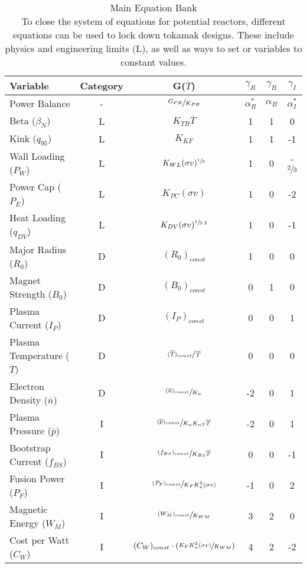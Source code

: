 \begin{table}[hb]
\caption[Main Equation Bank]{Main Equation Bank \\ \small To close the system of equations for potential reactors, different equations can be used to lock down tokamak designs. These include physics and engineering limits (L), as well as ways to set  or  variables to constant values.}
\begin{spacing}{1.5}
\begin{tabular}{lccccc}
 Variable & Category & G($\overline T$)  & $\gamma_R$ & $\gamma_B$ & $\gamma_{I}$ \\ \hline
Power Balance & - & $\sfrac{ G_{PB} }{ K_{PB} }$ & $\alpha_R^*$ & $\alpha_B$ & $\alpha_I^*$ \\
Beta ($\beta_N$) & L & $K_{TB} \overline T$ & 1 & 1 & 0 \\
Kink ($q_{95}$) & L & $K_{KF} $ & 1 & 1 & -1 \\
Wall Loading ($P_W$) & L & $K_{WL} ( \sigma v )^{\sfrac{1}{3}} $ & 1 & 0 & -$\sfrac{2}{3}$ \\
Power Cap ($P_E$) & L & $K_{PC} ( \sigma v ) $ & 1 & 0 & -2 \\
Heat Loading ($q_{DV}$) & L & $K_{DV} ( \sigma v )^{\sfrac{1}{3.2}} $ & 1 & 0 & -1 \\
Major Radius ($R_0$) & D & $(R_0)_{const}$ & 1 & 0 & 0 \\
Magnet Strength ($B_0$) & D & $(B_0)_{const}$ & 0 & 1 & 0 \\
Plasma Current ($I_P$) & D & $(I_P)_{const}$ & 0 & 0 & 1 \\
Plasma Temperature ($\overline T$) & D & $\sfrac{ (\overline T)_{const} }{ \, \overline T }$ & 0 & 0 & 0 \\
Electron Density ($\overline n$) & D & $\sfrac{ (\overline n)_{const} }{ K_n }$ & -2 & 0 & 1 \\
Plasma Pressure ($\overline p$) & I & $\sfrac{ (\overline p)_{const} }{ K_n K_{nT} \overline T }$ & -2 & 0 & 1 
\\
Bootstrap Current ($f_{BS}$) & I & $\sfrac{ ( f_{BS} )_{const} }{ K_{BS} \overline T }$ & 0 & 0 & -1 \\
Fusion Power ($P_F$) & I & $\sfrac{ (P_F)_{const} }{ K_F K_n ^ 2 ( \sigma v ) }$ & -1 & 0 & 2 \\
Magnetic Energy ($W_M$) & I & $\sfrac{ (W_M)_{const} }{ K_{WM} }$ & 3 & 2 & 0 \\
Cost per Watt ($C_W$) & I & $ (C_W)_{const} \cdot \left( \sfrac{ K_F K_n ^ 2 ( \sigma v ) }{ K_{WM} } \right)$ & 4 & 2 & -2 \\
\end{tabular}
\end{spacing}
\label{table:eq}
\end{table}

